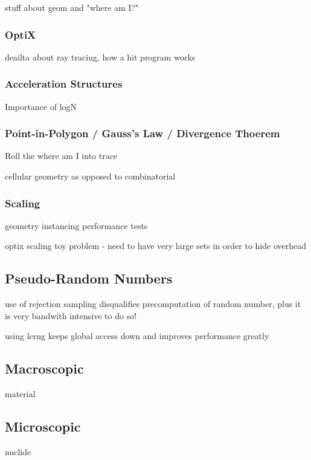 stuff about geom and "where am I?"

\subsubsection{OptiX}

deailta about ray tracing, how a hit program works

\subsubsection{Acceleration Structures}

Importance of logN


\subsubsection{Point-in-Polygon / Gauss's Law / Divergence Thoerem}

Roll the where am I into  trace

cellular geometry as opposed to combinatorial


\subsubsection{Scaling}

geometry instancing performance tests

optix scaling toy problem - need to have very large sets in order to hide overhead


\subsection{Pseudo-Random Numbers}

use of rejection sampling disqualifies precomputation of random number, plus it is very bandwith intensive to do so!

using lcrng keeps global access down and improves performance greatly

\subsection{Macroscopic}

material

\subsection{Microscopic}

nuclide

